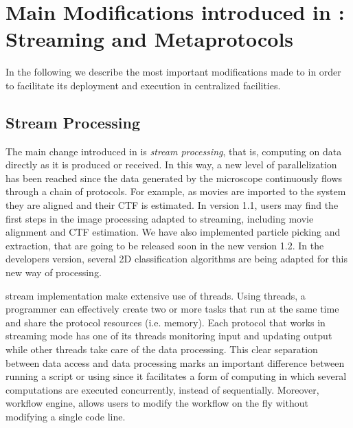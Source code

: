 \section{Main Modifications introduced in  \scipion: Streaming and Metaprotocols}
\label{overall}

In the following we describe the most important modifications made to \scipion in order to facilitate its deployment and execution in centralized facilities.

\subsection{Stream Processing}
The main change introduced in \scipion is \emph{stream processing}, that is, computing on data directly as it is produced or received.
In this way, a new level of parallelization has been reached since the  data generated by the microscope continuously flows through a chain of protocols. For example, as movies are imported to the system they are aligned and their CTF is estimated. In \scipion version 1.1, users may find  the first steps in the image processing adapted to streaming, including movie alignment and CTF estimation. We have also implemented particle picking and extraction, that are going to be released soon in the new version 1.2. In the developers version, several 2D classification algorithms are being adapted for this new way of processing.

\scipion stream implementation make extensive use of threads. %
Using threads, a programmer can effectively create two or more tasks that run at the same time and share the protocol resources (i.e. memory). 
Each protocol that works in streaming mode has one of its threads monitoring input and updating output  while other threads take care of the data processing. This clear separation between data access and data processing marks an important difference between running a script or using \scipion since it facilitates a form of computing in which several computations are executed  concurrently, instead of sequentially. Moreover, \scipion workflow engine, allows users to modify the workflow on the fly without modifying a single code line.

